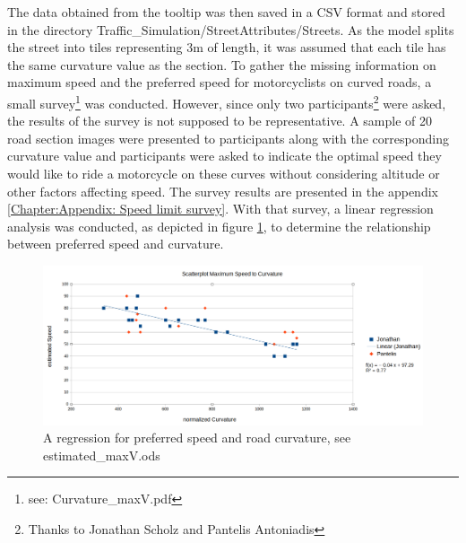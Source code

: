 The data obtained from the tooltip was then saved in a CSV format and stored in the directory Traffic\_Simulation/StreetAttributes/Streets. As the model splits the street into tiles representing 3m of length, it was assumed that each tile has the same curvature value as the section. 
To gather the missing information on maximum speed and the preferred speed for motorcyclists on curved roads, a small survey\footnote{see: Curvature\_maxV.pdf} was conducted. However, since only two  participants\footnote{Thanks to Jonathan Scholz and Pantelis Antoniadis} were asked, the results of the survey is not supposed to be representative. A sample of 20 road section images were presented to participants along with the corresponding curvature value and participants were asked to indicate the optimal speed they would like to ride a motorcycle on these curves without considering altitude or other factors affecting speed. The survey results are presented in the appendix \ref{Chapter:Appendix: Speed limit survey}. With that survey, a linear regression analysis was conducted, as depicted in figure \ref{fig:regressionPrefspeed}, to determine the relationship between preferred speed and curvature. 

\begin{figure}[h]
    \centering
    \includegraphics[width=1.0\linewidth]{images/regression.png}
    \caption{A regression for preferred speed and road curvature, see estimated\_maxV.ods}
    \label{fig:regressionPrefspeed}
\end{figure}

